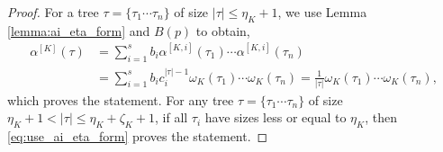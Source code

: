 \documentclass[sn-mathphys-num]{sn-jnl}%
\newcommand{\reva}[1]{#1}%
\theoremstyle{thmstyleone}%
\theoremstyle{thmstyletwo}%
\theoremstyle{thmstylethree}%
\begin{document}
\begin{proof}
    For a tree $\tau = \reva{\{\tau_1 \cdots \tau_n\}}$ of size $|\tau| \leq \eta_K + 1$, we use Lemma \ref{lemma:ai_eta_form} and $B(p)$ to obtain,
    \begin{align}
        \alpha^{[K]}(\tau) &= \sum_{i=1}^s b_i \reva{\alpha^{[K,i]}(\tau_1) \cdots \alpha^{[K,i]}(\tau_n)} \nonumber \\
                           &= \sum_{i=1}^s b_i c_i^{|\tau|-1} \reva{\omega_K (\tau_1) \cdots \omega_K (\tau_n)} = \frac{1}{|\tau|} \reva{\omega_K (\tau_1) \cdots \omega_K (\tau_n)},
        \label{eq:use_ai_eta_form}
    \end{align}
    which proves the statement.
    For any tree $\tau = \reva{\{\tau_1 \cdots \tau_n\}}$ of size $\eta_K + 1 < |\tau| \leq \eta_K + \zeta_K + 1$, if all $\tau_i$ have sizes less or equal to $\eta_K$, then \eqref{eq:use_ai_eta_form} proves the statement.


\end{proof}
\end{document}
